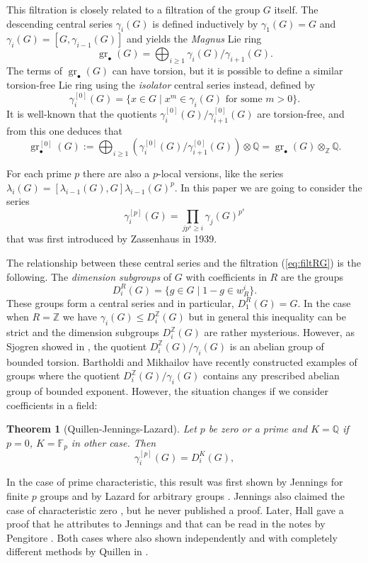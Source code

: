 \documentclass[10pt, oneside]{amsart}
\newcommand{\Z}{\mathbb{Z}} %
\newcommand{\F}{\mathbb{F}}
\newcommand{\Q}{\mathbb{Q}}
\newcommand{\gr}{\operatorname{gr}} %
\newtheorem{theorem}{Theorem}[section]
\theoremstyle{definition}
\theoremstyle{remark}
\theoremstyle{plain}
\begin{document}
This filtration is closely related to a filtration of the group $G$ itself. The descending central series $\gamma_i(G)$ is defined inductively by $\gamma_1(G)=G$ and $\gamma_i(G)=[G,\gamma_{i-1}(G)]$ and yields the {\sl Magnus} Lie ring
$$\gr_\bullet(G)=\bigoplus_{i\geq 1}\gamma_i(G)/\gamma_{i+1}(G).$$
The terms of $\gr_\bullet(G)$ can have torsion, but it is possible to define a similar torsion-free Lie ring using the {\sl isolator} central series instead, defined by
$$\gamma_i^{[0]}(G)=\{x\in G\mid x^m\in\gamma_i(G)\text{ for some }m>0\}.$$
It is well-known that the quotients $\gamma^{[0]}_i(G)/\gamma^{[0]}_{i+1}(G)$ are torsion-free, and from this one deduces that 
$$\gr^{[0]}_\bullet(G):=\bigoplus_{i\geq 1}(\gamma^{[0]}_i(G)/\gamma^{[0]}_{i+1}(G))\otimes\Q=\gr_\bullet(G)\otimes_\Z\Q.$$

For each prime $p$ there are also a $p$-local versions, like the series 
$\lambda_i(G)=[\lambda_{i-1}(G),G]\lambda_{i-1}(G)^p$. In this paper we are going to consider
the series
$$\gamma_i^{[p]}(G)=\prod_{jp^s\geq i}\gamma_j(G)^{p^s}$$
that was first introduced by Zassenhaus in 1939.

The relationship between these central series and the filtration (\ref{eq:filtRG}) is the following. The {\sl dimension subgroups} of $G$ with coefficients in $R$ are the groups
$$D_i^R(G)=\{g\in G\mid 1-g\in w_R^i\}.$$
These groups form a central series and in particular, $D_1^R(G)=G$. In the case when $R=\Z$ we have $\gamma_i(G)\leq D^\Z_i(G)$ but in general this inequality can be strict \cite{Rips} and the dimension subgroups $D^\Z_i(G)$ are rather mysterious. However, as Sjogren showed in \cite{Sjogren}, the quotient $D^\Z_i(G)/\gamma_i(G)$ is an abelian group of bounded torsion. Bartholdi and Mikhailov have recently constructed examples of groups where the quotient $D^\Z_i(G)/\gamma_i(G)$ contains any prescribed abelian group of bounded exponent.
However, the situation changes if we consider coefficients in a field:

\begin{theorem}[Quillen-Jennings-Lazard] Let $p$ be zero or a prime and $K=\Q$ if $p=0$, $K=\F_p$ in other case. Then
$$\gamma_i^{[p]}(G)=D_i^{K}(G),$$
\end{theorem}

 In the case of prime characteristic, this result was first shown by Jennings for finite $p$ groups  \cite{JenningsP} and by Lazard for arbitrary groups  \cite{Lazard}. 
Jennings also claimed the case of characteristic zero  \cite{Jennings0}, but he never published a proof. Later, Hall gave a proof that he attributes to Jennings and that can be read in the notes by Pengitore \cite{Hall}. Both cases where also shown independently  and with completely different methods by Quillen in \cite{Quillen}.  
\end{document}
